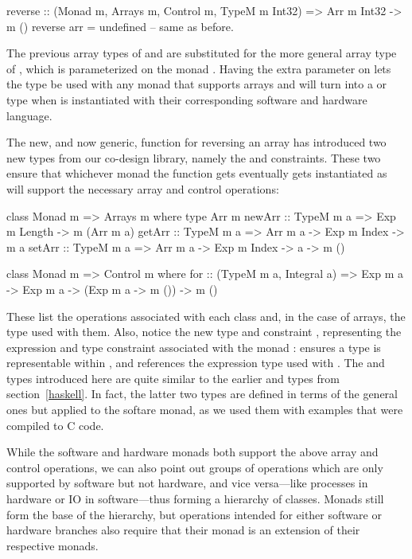 \documentclass[../main.tex]{subfiles}
\begin{document}
\begin{code}
reverse :: (Monad m, Arrays m, Control m, TypeM m Int32)
  => Arr m Int32 -> m ()
reverse arr = undefined -- same as before.
\end{code}

\noindent The previous array types of  and  are substituted for the more general array type of , which is parameterized on the monad . Having the extra parameter on  lets the type be used with any monad that supports arrays and will turn into a  or  type when  is instantiated with their corresponding software and hardware language.

The new, and now generic, function for reversing an array has introduced two new types from our co-design library, namely the  and  constraints. These two ensure that whichever monad the function gets eventually gets instantiated as will support the necessary array and control operations:

\begin{code}
class Monad m => Arrays m where
  type Arr m
  newArr :: TypeM m a => Exp m Length -> m (Arr m a)
  getArr :: TypeM m a => Arr m a -> Exp m Index -> m a
  setArr :: TypeM m a => Arr m a -> Exp m Index -> a -> m ()

class Monad m => Control m where
  for :: (TypeM m a, Integral a) => Exp m a -> Exp m a -> (Exp m a -> m ())
      -> m ()
\end{code}

\noindent These list the operations associated with each class and, in the case of arrays, the type used with them. Also, notice the new type  and constraint , representing the expression and type constraint associated with the monad :  ensures a type is representable within , and  references the expression type used with . The  and  types introduced here are quite similar to the earlier  and  types from section~\ref{haskell}. In fact, the latter two types are defined in terms of the general ones but applied to the softare monad, as we used them with examples that were compiled to C code.

While the software and hardware monads both support the above array and control operations, we can also point out groups of operations which are only supported by software but not hardware, and vice versa---like processes in hardware or IO in software---thus forming a hierarchy of classes. Monads still form the base of the hierarchy, but operations intended for either software or hardware branches also require that their monad is an extension of their respective monads.
\end{document}
